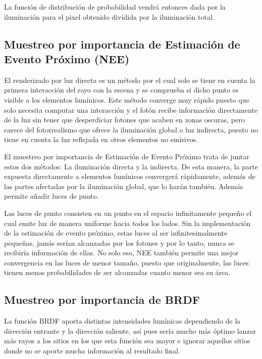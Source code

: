 La función de distribución de probabilidad vendrá entonces dada por la iluminación para el pixel obtenido dividida por la iluminación total.


\subsection{Muestreo por importancia de Estimación de Evento Próximo (NEE)}



El renderizado por luz directa es un método por el cual solo se tiene en cuenta la primera interacción del rayo con la escena y se comprueba si dicho punto es visible a los elementos lumínicos. Este método converge muy rápido puesto que solo necesita computar una interacción y el fotón recibe información directamente de la luz sin tener que desperdiciar fotones que acaben en zonas oscuras, pero carece del fotorrealismo que ofrece la iluminación global o luz indirecta, puesto no tiene en cuenta la luz reflejada en otros elementos no emisivos.

El muestreo por importancia de Estimación de Evento Próximo trata de juntar estos dos métodos: La iluminación directa y la indirecta. De esta manera, la parte expuesta directamente a elementos lumínicos convergerá rápidamente, además de las partes afectadas por la iluminación global, que lo harán también. Además permite añadir luces de punto. 

Las luces de punto consisten en un punto en el espacio infinitamente pequeño el cual emite luz de manera uniforme hacia todos los lados. Sin la implementación de la estimación de evento próximo, estas luces al ser infinitesimalmente pequeñas, jamás serían alcanzadas por los fotones y por lo tanto, nunca se recibiría información de ellas. No solo eso, NEE también permite una mejor convergencia en las luces de menor tamaño, puesto que originalmente, las luces tienen menos probabilidades de ser alcanzadas cuanto menor sea su área.


\subsection{Muestreo por importancia de BRDF}

La función BRDF aporta distintas intensidades lumínicas dependiendo de la dirección entrante y la dirección saliente, así pues sería mucho más óptimo lanzar más rayos a los sitios en los que esta función sea mayor e ignorar aquellos sitios donde no se aporte mucha información al resultado final.

